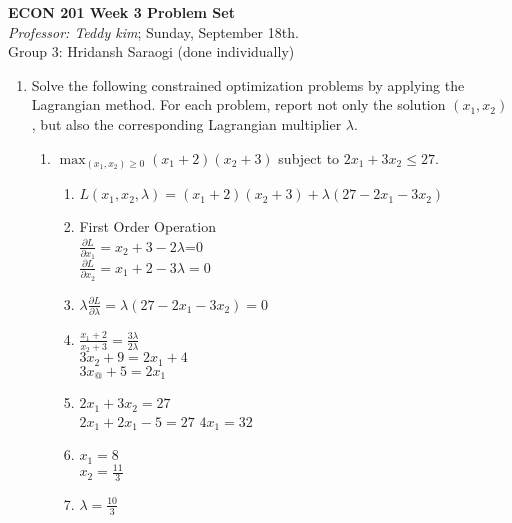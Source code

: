\documentclass[11pt]{article}
\begin{document}
\begin{center}
\textbf{ECON 201 Week 3 Problem Set}\\
\textit {Professor: Teddy kim};  
Sunday, September 18th.
\\Group 3: Hridansh Saraogi (done individually)
\end{center}

\begin{enumerate}
\item Solve the following constrained optimization problems by applying the Lagrangian method. For each problem, report not only the solution $(x_{1},x_{2})$, but also the corresponding Lagrangian multiplier $\lambda$.
    \begin{enumerate}
        \item $\max_{(x_{1},x_{2})\geq 0}(x_{1}+2)(x_{2}+3)$ subject to $2x_{1}+3x_{2}\leq 27$.
        \begin{enumerate}
                \item $L(x_1, x_2, \lambda) = (x_1 + 2) (x_2 + 3) + \lambda(27 - 2x_1 - 3x_2)$
                \item First Order Operation\\
                $\frac{\partial L}{\partial x_1} = x_2 + 3 -2\lambda$=0\\
                $\frac{\partial L}{\partial x_2} = x_1 + 2 -3\lambda=0$
                \item $\lambda \frac{\partial L}{\partial \lambda} = \lambda (27 -2x_1 -3x_2) = 0$
                \item $\frac{x_1 + 2}{x_2 + 3} = \frac{3\lambda}{2\lambda}$\\
                $3x_2 + 9 = 2x_1 + 4$\\
                $3x_@ + 5 = 2x_1$\\
                \item $2x_1 +3x_2 = 27$\\
                $2x_1 +2x_1 - 5 = 27$
                $4x_1 = 32$
                \item $x_1 = 8$\\
                $x_2 = \frac{11}{3}$
                \item $\lambda = \frac{10}{3}$
        \end{enumerate}


\end{enumerate}
\end{enumerate}
\end{document}
